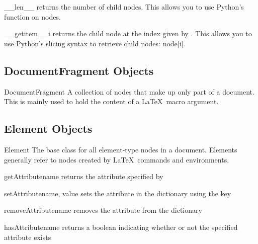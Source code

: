 \documentclass{manual}
\begin{document}
\begin{methoddesc}[Node]{\_\_len\_\_}{}
returns the number of child nodes.  This allows you to use Python's 
 function on nodes.
\end{methoddesc}

\begin{methoddesc}[Node]{\_\_getitem\_\_}{i}
returns the child node at the index given by .  This allows you to
use Python's slicing syntax to retrieve child nodes: node[i].
\end{methoddesc}


\subsection{DocumentFragment Objects}

\begin{classdesc}{DocumentFragment}{}
A collection of nodes that make up only part of a document.  This is 
mainly used to hold the content of a \LaTeX\ macro argument.
\end{classdesc}


\subsection{Element Objects}

\begin{classdesc}{Element}{}
The base class for all element-type nodes in a document.  Elements generally
refer to nodes created by \LaTeX\ commands and environments.
\end{classdesc}

\begin{methoddesc}[Element]{getAttribute}{name}
returns the attribute specified by 
\end{methoddesc}

\begin{methoddesc}[Element]{setAttribute}{name, value}
sets the attribute  in the  dictionary
using the key 
\end{methoddesc}

\begin{methoddesc}[Element]{removeAttribute}{name}
removes the attribute  from the  dictionary
\end{methoddesc}

\begin{methoddesc}[Element]{hasAttribute}{name}
returns a boolean indicating whether or not the specified attribute exists
\end{methoddesc}
\end{document}
